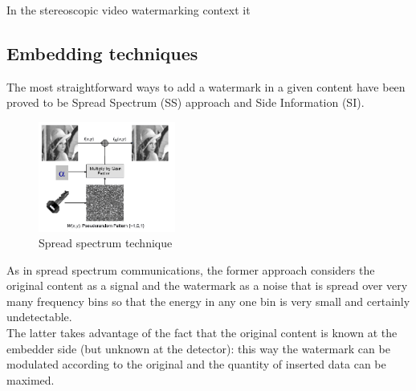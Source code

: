 In the stereoscopic video watermarking context it

\subsection{Embedding techniques}
The most straightforward ways to add a watermark in a given content have been proved to be Spread Spectrum (SS) approach and Side Information (SI).\\
\begin{figure}[h!]
\centering
\includegraphics[width=0.4\textwidth]{./img/ss.png}
\caption{\small{Spread spectrum technique}}
\label{fig:ss}
\end{figure}
As in spread spectrum communications, the former approach considers the original
content as a signal and the watermark as a noise that is spread over very many frequency bins so that the energy in any one bin is very small and certainly undetectable.\\
The latter takes advantage of the fact that the original content is known at the
embedder side (but unknown at the detector): this way the watermark can be modulated  according to the original and the quantity of
inserted data can be maximed.\\

